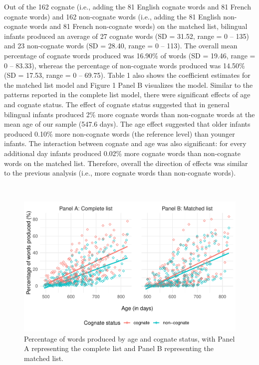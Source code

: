 \documentclass[
  english,
  ,man,floatsintext]{apa6}
\begin{document}
Out of the 162 cognate (i.e., adding the 81 English cognate words and 81 French cognate words) and 162 non-cognate words (i.e., adding the 81 English non-cognate words and 81 French non-cognate words) on the matched list, bilingual infants produced an average of 27 cognate words (SD = 31.52, range = 0 -- 135) and 23 non-cognate words (SD = 28.40, range = 0 -- 113). The overall mean percentage of cognate words produced was 16.90\% of words (SD = 19.46, range = 0 -- 83.33), whereas the percentage of non-cognate words produced was 14.50\% (SD = 17.53, range = 0 -- 69.75). Table 1 also shows the coefficient estimates for the matched list model and Figure 1 Panel B visualizes the model. Similar to the patterns reported in the complete list model, there were significant effects of age and cognate status. The effect of cognate status suggested that in general bilingual infants produced 2\% more cognate words than non-cognate words at the mean age of our sample (547.6 days). The age effect suggested that older infants produced 0.10\% more non-cognate words (the reference level) than younger infants. The interaction between cognate and age was also significant: for every additional day infants produced 0.02\% more cognate words than non-cognate words on the matched list. Therefore, overall the direction of effects was similar to the previous analysis (i.e., more cognate words than non-cognate words).

~

\begin{figure}

{\centering \includegraphics[width=1.2\linewidth]{CogVocab_paper_files/figure-latex/Fig1-1} 

}

\caption{Percentage of words produced by age and cognate status, with Panel A representing the complete list and Panel B representing the matched list.}\label{fig:Fig1}
\end{figure}
\end{document}
